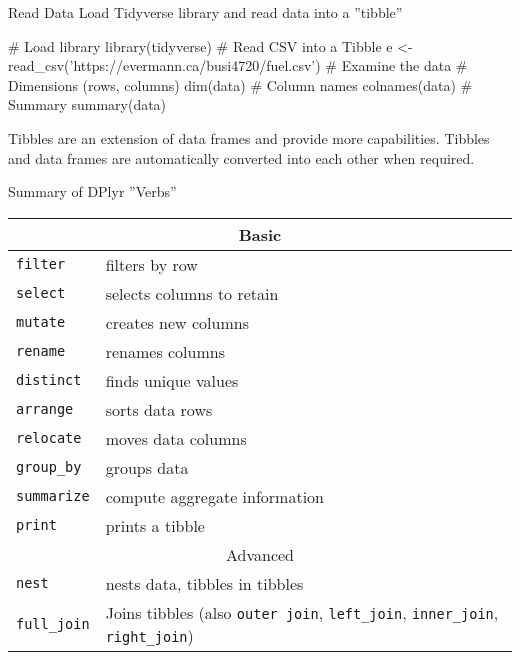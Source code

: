 \documentclass[ignorenonframetext,xcolor=x11names]{beamer}
\begin{document}
\begin{frame}[fragile]{Read Data}
Load Tidyverse library and read data into a ''tibble''

\begin{Rcode}
# Load library
library(tidyverse)
# Read CSV into a Tibble
e <- read_csv('https://evermann.ca/busi4720/fuel.csv')
# Examine the data
# Dimensions (rows, columns)
dim(data)
# Column names
colnames(data)
# Summary
summary(data)
\end{Rcode}

Tibbles are an extension of data frames and provide more capabilities. Tibbles and data frames are automatically converted into each other when required.
\end{frame}


\begin{frame}{Summary of DPlyr ''Verbs''}

\footnotesize
\centering
\renewcommand{\arraystretch}{1.25}

\begin{tabularx}{\textwidth}{l|X} \hline
\multicolumn{2}{c}{Basic} \\ \hline
\texttt{filter} & filters by row \\
\texttt{select} & selects columns to retain \\
\texttt{mutate} & creates new columns \\
\texttt{rename} & renames columns \\
\texttt{distinct} & finds unique values \\
\texttt{arrange} & sorts data rows \\
\texttt{relocate} & moves data columns \\
\texttt{group\_by} & groups data \\
\texttt{summarize} & compute aggregate information \\
\texttt{print} & prints a tibble \\  \hline
\multicolumn{2}{c}{Advanced} \\ \hline
\texttt{nest} & nests data, tibbles in tibbles \\
\texttt{full\_join} & Joins tibbles (also \texttt{outer join}, \texttt{left\_join}, \texttt{inner\_join}, \texttt{right\_join}) \\ \hline
\end{tabularx}

\end{frame}
\end{document}
